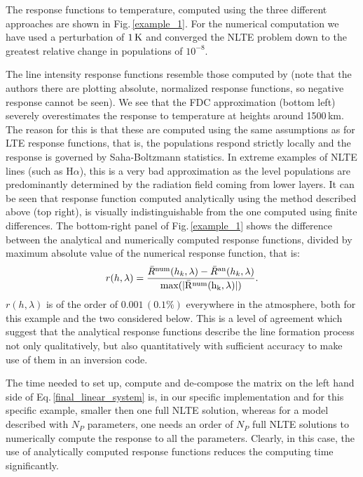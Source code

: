 \documentclass{aa}
\begin{document}
The response functions to temperature, computed using the three different approaches are shown in Fig.\,\ref{example_1}. For the numerical computation we have used a perturbation of $1\,\rm{K}$ and converged the NLTE problem down to the greatest relative change in populations of $10^{-8}$. 

The line intensity response functions resemble those computed by \citet{Hector_halpha} (note that the authors there are plotting absolute, normalized response functions, so negative response cannot be seen). We see that the FDC approximation (bottom left) severely overestimates the response to temperature at heights around 1500\,km. The reason for this is that these are computed using the same assumptions as for LTE response functions, that is, the populations respond strictly locally and the response is governed by Saha-Boltzmann statistics. In extreme examples of NLTE lines (such as H$\alpha$), this is a very bad approximation as the level populations are predominantly determined by the radiation field coming from lower layers. It can be seen that response function computed analytically using the method described above (top right), is visually indistinguishable from the one computed using finite differences. The bottom-right panel of Fig.\,\ref{example_1} shows the difference between the analytical and numerically computed response functions, divided by maximum absolute value of the numerical response function, that is:
\begin{equation}
r(h,\lambda) = \frac{\bar{R}^{\rm num}(h_k,\lambda) - \bar{R}^{\rm an}(h_k,\lambda)}{\rm max (|\bar{R}^{\rm num}(h_k,\lambda)|)}.
\end{equation}
$r(h,\lambda)$ is of the order of $0.001\,(0.1\%)$ everywhere in the atmosphere, both for this example and the two considered below. This is a level of agreement which suggest that the analytical response functions describe the line formation process not only qualitatively, but also quantitatively with sufficient accuracy to make use of them in an inversion code. 

 The time needed to set up, compute and de-compose the matrix on the left hand side of Eq.\,\ref{final_linear_system} is, in our specific implementation and for this specific example, smaller then one full NLTE solution, whereas for a model described with $N_P$ parameters, one needs an order of $N_P$ full NLTE solutions to numerically compute the response to all the parameters. Clearly, in this case, the use of analytically computed response functions reduces the computing time significantly.
\end{document}
